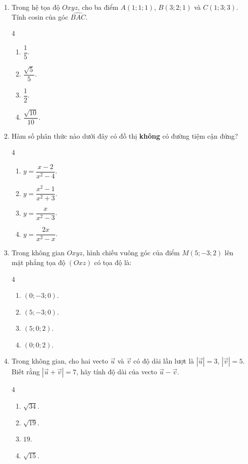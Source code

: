 \documentclass[12pt]{article}
\begin{document}
\begin{enumerate}[label=\textbf{Câu \arabic*.}, leftmargin=*]
		\item Trong hệ tọa độ $Oxyz$, cho ba điểm $A(1; 1; 1)$, $B(3; 2; 1)$ và $C(1; 3; 3)$. Tính cosin của góc $\widehat{BAC}$.
		\begin{multicols}{4}
			\begin{enumerate}[label=\Alph*.]
				\item $\dfrac{1}{5}$.
				\item $\dfrac{\sqrt{5}}{5}$.
				\item $\dfrac{1}{2}$.
				\item $\dfrac{\sqrt{10}}{10}$.
			\end{enumerate}
		\end{multicols}
		
		\item Hàm số phân thức nào dưới đây có đồ thị \textbf{không} có đường tiệm cận đứng?
		\begin{multicols}{4}
			\begin{enumerate}[label=\Alph*.]
				\item $y = \dfrac{x - 2}{x^2 - 4}$.
				\item $y = \dfrac{x^2 - 1}{x^2 + 3}$.
				\item $y = \dfrac{x}{x^2 - 3}$.
				\item $y = \dfrac{2x}{x^2 - x}$.
			\end{enumerate}
		\end{multicols}
		
		\item Trong không gian $Oxyz$, hình chiếu vuông góc của điểm $M(5; -3; 2)$ lên mặt phẳng tọa độ $(Oxz)$ có tọa độ là:
		\begin{multicols}{4}
			\begin{enumerate}[label=\Alph*.]
				\item $(0; -3; 0)$.
				\item $(5; -3; 0)$.
				\item $(5; 0; 2)$.
				\item $(0; 0; 2)$.
			\end{enumerate}
		\end{multicols}
		
		\item Trong không gian, cho hai vecto $\vec{u}$ và $\vec{v}$ có độ dài lần lượt là $|\vec{u}| = 3$, $|\vec{v}| = 5$. Biết rằng $|\vec{u} + \vec{v}| = 7$, hãy tính độ dài của vecto $\vec{u} - \vec{v}$.
		\begin{multicols}{4}
			\begin{enumerate}[label=\Alph*.]
				\item $\sqrt{34}$.
				\item $\sqrt{19}$.
				\item $19$.
				\item $\sqrt{15}$.
			\end{enumerate}
		\end{multicols}
		

\end{enumerate}
\end{document}
